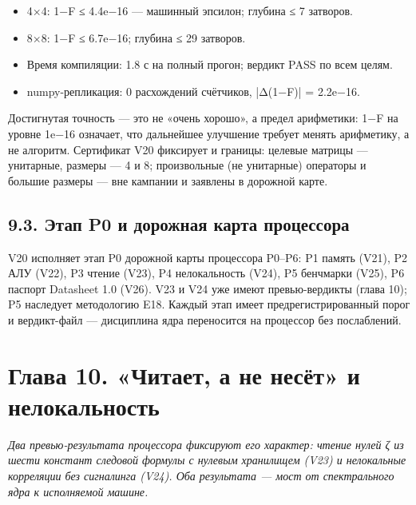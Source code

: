 \documentclass[11pt,a4paper]{article}
\begin{document}
\begin{itemize}
  \item 4×4: 1−F ≤ 4.4e−16 — машинный эпсилон; глубина ≤ 7 затворов.
  \item 8×8: 1−F ≤ 6.7e−16; глубина ≤ 29 затворов.
  \item Время компиляции: 1.8 с на полный прогон; вердикт PASS по всем целям.
  \item numpy-репликация: 0 расхождений счётчиков, |Δ(1−F)| = 2.2e−16.
\end{itemize}

\begin{center}\end{center}

Достигнутая точность — это не «очень хорошо», а предел арифметики: 1−F на уровне 1e−16 означает, что дальнейшее улучшение требует менять арифметику, а не алгоритм. Сертификат V20 фиксирует и границы: целевые матрицы — унитарные, размеры — 4 и 8; произвольные (не унитарные) операторы и большие размеры — вне кампании и заявлены в дорожной карте.

\subsection{9.3. Этап P0 и дорожная карта процессора}

V20 исполняет этап P0 дорожной карты процессора P0–P6: P1 память (V21), P2 АЛУ (V22), P3 чтение (V23), P4 нелокальность (V24), P5 бенчмарки (V25), P6 паспорт Datasheet 1.0 (V26). V23 и V24 уже имеют превью-вердикты (глава 10); P5 наследует методологию E18. Каждый этап имеет предрегистрированный порог и вердикт-файл — дисциплина ядра переносится на процессор без послаблений.

\section{Глава 10. «Читает, а не несёт» и нелокальность}

\noindent\textit{\color{copper}Два превью-результата процессора фиксируют его характер: чтение нулей ζ из шести констант следовой формулы с нулевым хранилищем (V23) и нелокальные корреляции без сигналинга (V24). Оба результата — мост от спектрального ядра к исполняемой машине.}
\end{document}

